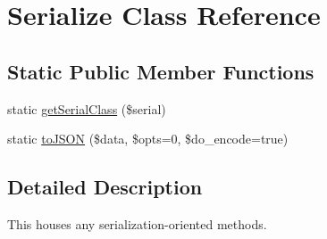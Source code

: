 \hypertarget{classSerialize}{
\section{Serialize Class Reference}
\label{classSerialize}
}
\subsection*{Static Public Member Functions}
\begin{DoxyCompactItemize}
\item 
static \hyperlink{classSerialize_aa315f53f9a533f087af8c01cf9d18b8e}{getSerialClass} (\$serial)
\item 
static \hyperlink{classSerialize_af8e93bb937969b273883d9385021b324}{toJSON} (\$data, \$opts=0, \$do\_\-encode=true)
\end{DoxyCompactItemize}


\subsection{Detailed Description}
This houses any serialization-\/oriented methods. 

